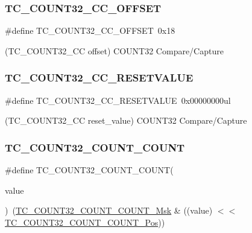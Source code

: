 \subsubsection{\texorpdfstring{TC\_COUNT32\_CC\_OFFSET}{TC\_COUNT32\_CC\_OFFSET}}
{\footnotesize\ttfamily \#define T\+C\+\_\+\+C\+O\+U\+N\+T32\+\_\+\+C\+C\+\_\+\+O\+F\+F\+S\+ET~0x18}



(T\+C\+\_\+\+C\+O\+U\+N\+T32\+\_\+\+CC offset) C\+O\+U\+N\+T32 Compare/\+Capture 

\mbox{\label{group___s_a_m_d21___t_c_ga491a3e923045fb5ed9428871514b3c81}} 
\subsubsection{\texorpdfstring{TC\_COUNT32\_CC\_RESETVALUE}{TC\_COUNT32\_CC\_RESETVALUE}}
{\footnotesize\ttfamily \#define T\+C\+\_\+\+C\+O\+U\+N\+T32\+\_\+\+C\+C\+\_\+\+R\+E\+S\+E\+T\+V\+A\+L\+UE~0x00000000ul}



(T\+C\+\_\+\+C\+O\+U\+N\+T32\+\_\+\+CC reset\+\_\+value) C\+O\+U\+N\+T32 Compare/\+Capture 

\mbox{\label{group___s_a_m_d21___t_c_gae01e6b763292e3d1d648a2764f2db5a9}} 
\subsubsection{\texorpdfstring{TC\_COUNT32\_COUNT\_COUNT}{TC\_COUNT32\_COUNT\_COUNT}}
{\footnotesize\ttfamily \#define T\+C\+\_\+\+C\+O\+U\+N\+T32\+\_\+\+C\+O\+U\+N\+T\+\_\+\+C\+O\+U\+NT(\begin{DoxyParamCaption}\item[{}]{value }\end{DoxyParamCaption})~(\mbox{\hyperlink{group___s_a_m_d21___t_c_ga194f6888ec96eb753c0167461328a661}{T\+C\+\_\+\+C\+O\+U\+N\+T32\+\_\+\+C\+O\+U\+N\+T\+\_\+\+C\+O\+U\+N\+T\+\_\+\+Msk}} \& ((value) $<$$<$ \mbox{\hyperlink{group___s_a_m_d21___t_c_gaeac7c87ea7b5a489929b6fa1c141fbaf}{T\+C\+\_\+\+C\+O\+U\+N\+T32\+\_\+\+C\+O\+U\+N\+T\+\_\+\+C\+O\+U\+N\+T\+\_\+\+Pos}}))}

